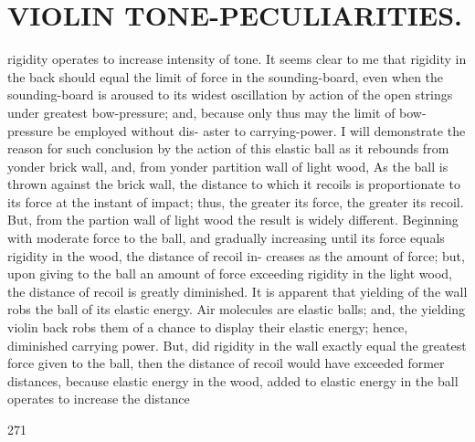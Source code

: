 \documentclass{article}
\begin{document}
\section*{VIOLIN TONE-PECULIARITIES.}
rigidity operates to increase intensity of tone. It seems clear to me that rigidity in the back should equal the limit of force in the sounding-board, even when the sounding-board is aroused to its widest oscillation by action of the open strings under greatest bow-pressure; and, because only thus may the limit of bow-pressure be employed without dis- aster to carrying-power. I will demonstrate the reason for such conclusion by the action of this elastic ball as it rebounds from yonder brick wall, and, from yonder partition wall of light wood, As the ball is thrown against the brick wall, the distance to which it recoils is proportionate to its force at the instant of impact; thus, the greater its force, the greater its recoil. But, from the partion wall of light wood the result is widely different. Beginning with moderate force to the ball, and gradually increasing until its force equals rigidity in the wood, the distance of recoil in- creases as the amount of force; but, upon giving to the ball an amount of force exceeding rigidity in the light wood, the distance of recoil is greatly diminished. It is apparent that yielding of the wall robs the ball of its elastic energy. Air molecules are elastic balls; and, the yielding violin back robs them of a chance to display their elastic energy; hence, diminished carrying power. But, did rigidity in the wall exactly equal the greatest force given to the ball, then the distance of recoil would have exceeded former distances, because elastic energy in the wood, added to elastic energy in the ball operates to increase the distance

271
\end{document}
